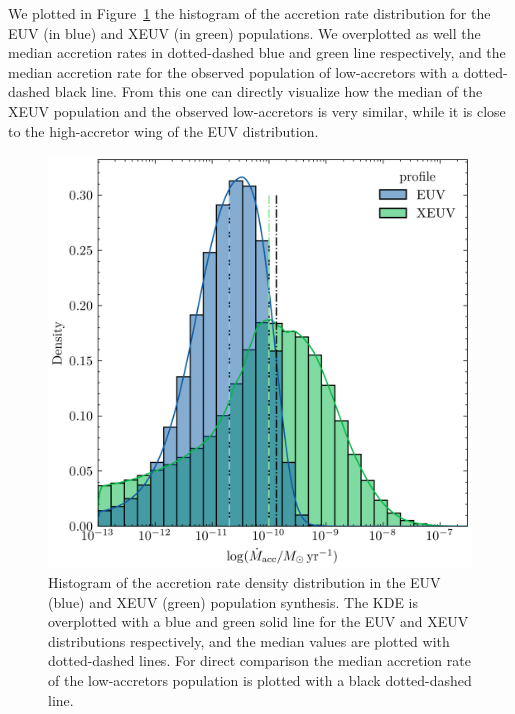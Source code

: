 \documentclass[fleqn,usenatbib,letters]{mnras}
\begin{document}
We plotted in Figure~\ref{fig:hist_mdot} the histogram of the accretion rate distribution for the EUV (in blue) and XEUV (in green) populations. We overplotted as well the median accretion rates in dotted-dashed blue and green line respectively, and the median accretion rate for the observed population of low-accretors with a dotted-dashed black line. From this one can directly visualize how the median of the XEUV population and the observed low-accretors is very similar, while it is close to the high-accretor wing of the EUV distribution.
\begin{figure}
    \includegraphics[width=\columnwidth]{hist_mdot.png}
    \caption{Histogram of the accretion rate density distribution in the EUV (blue) and XEUV (green) population synthesis. The KDE is overplotted with a blue and green solid line for the EUV and XEUV distributions respectively, and the median values are plotted with dotted-dashed lines. For direct comparison the median accretion rate of the low-accretors population is plotted with a black dotted-dashed line.\label{fig:hist_mdot}}
\end{figure}
\end{document}
